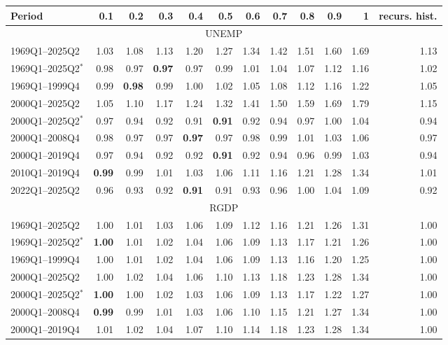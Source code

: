 \begin{tabular}{lrrrrrrrrrrr}
\hline
Period & 0.1 & 0.2 & 0.3 & 0.4 & 0.5 & 0.6 & 0.7 & 0.8 & 0.9 & 1 & recurs. hist. \\
\hline
\multicolumn{12}{c}{UNEMP} \\
1969Q1--2025Q2 & 1.03 & 1.08 & 1.13 & 1.20 & 1.27 & 1.34 & 1.42 & 1.51 & 1.60 & 1.69 & 1.13 \\
1969Q1--2025Q2$^*$ & 0.98 & 0.97 & \textbf{0.97} & 0.97 & 0.99 & 1.01 & 1.04 & 1.07 & 1.12 & 1.16 & 1.02 \\
1969Q1--1999Q4 & 0.99 & \textbf{0.98} & 0.99 & 1.00 & 1.02 & 1.05 & 1.08 & 1.12 & 1.16 & 1.22 & 1.05 \\
2000Q1--2025Q2 & 1.05 & 1.10 & 1.17 & 1.24 & 1.32 & 1.41 & 1.50 & 1.59 & 1.69 & 1.79 & 1.15 \\
2000Q1--2025Q2$^*$ & 0.97 & 0.94 & 0.92 & 0.91 & \textbf{0.91} & 0.92 & 0.94 & 0.97 & 1.00 & 1.04 & 0.94 \\
2000Q1--2008Q4 & 0.98 & 0.97 & 0.97 & \textbf{0.97} & 0.97 & 0.98 & 0.99 & 1.01 & 1.03 & 1.06 & 0.97 \\
2000Q1--2019Q4 & 0.97 & 0.94 & 0.92 & 0.92 & \textbf{0.91} & 0.92 & 0.94 & 0.96 & 0.99 & 1.03 & 0.94 \\
2010Q1--2019Q4 & \textbf{0.99} & 0.99 & 1.01 & 1.03 & 1.06 & 1.11 & 1.16 & 1.21 & 1.28 & 1.34 & 1.01 \\
2022Q1--2025Q2 & 0.96 & 0.93 & 0.92 & \textbf{0.91} & 0.91 & 0.93 & 0.96 & 1.00 & 1.04 & 1.09 & 0.92 \\
\hline
\multicolumn{12}{c}{RGDP} \\
1969Q1--2025Q2 & 1.00 & 1.01 & 1.03 & 1.06 & 1.09 & 1.12 & 1.16 & 1.21 & 1.26 & 1.31 & 1.00 \\
1969Q1--2025Q2$^*$ & \textbf{1.00} & 1.01 & 1.02 & 1.04 & 1.06 & 1.09 & 1.13 & 1.17 & 1.21 & 1.26 & 1.00 \\
1969Q1--1999Q4 & 1.00 & 1.01 & 1.02 & 1.04 & 1.06 & 1.09 & 1.13 & 1.16 & 1.20 & 1.25 & 1.00 \\
2000Q1--2025Q2 & 1.00 & 1.02 & 1.04 & 1.06 & 1.10 & 1.13 & 1.18 & 1.23 & 1.28 & 1.34 & 1.00 \\
2000Q1--2025Q2$^*$ & \textbf{1.00} & 1.00 & 1.02 & 1.03 & 1.06 & 1.09 & 1.13 & 1.17 & 1.22 & 1.27 & 1.00 \\
2000Q1--2008Q4 & \textbf{0.99} & 0.99 & 1.01 & 1.03 & 1.06 & 1.10 & 1.15 & 1.21 & 1.27 & 1.34 & 1.00 \\
2000Q1--2019Q4 & 1.01 & 1.02 & 1.04 & 1.07 & 1.10 & 1.14 & 1.18 & 1.23 & 1.28 & 1.34 & 1.00 \\

\end{tabular}
